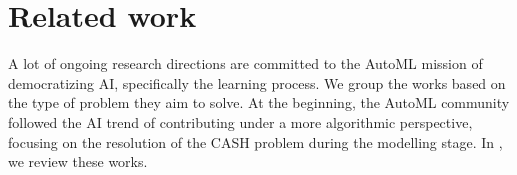 

\section{Related work}
\label{sec:relatedwork}
A lot of ongoing research directions are committed to the AutoML mission of democratizing AI, specifically the learning process.
We group the works based on the type of problem they aim to solve.
%
At the beginning, the AutoML community followed the AI trend of contributing under a more algorithmic perspective, focusing on the resolution of the CASH problem during the modelling stage.
In , we review these works.

